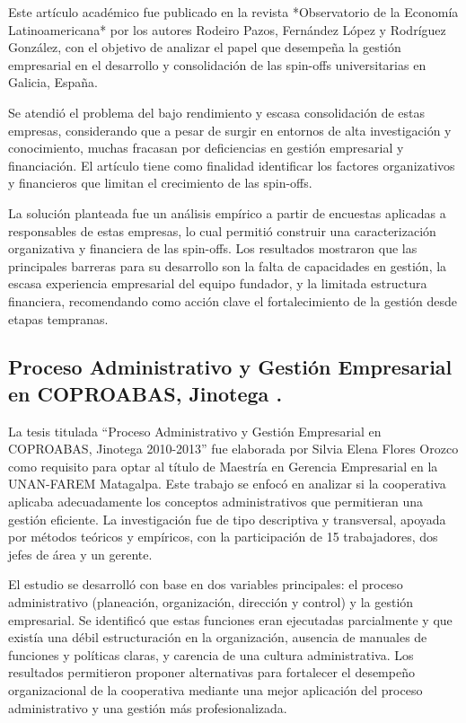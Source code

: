 Este artículo académico fue publicado en la revista *Observatorio de la Economía Latinoamericana* por los autores Rodeiro Pazos, Fernández López y Rodríguez González, con el objetivo de analizar el papel que desempeña la gestión empresarial en el desarrollo y consolidación de las spin-offs universitarias en Galicia, España. 

Se atendió el problema del bajo rendimiento y escasa consolidación de estas empresas, considerando que a pesar de surgir en entornos de alta investigación y conocimiento, muchas fracasan por deficiencias en gestión empresarial y financiación. El artículo tiene como finalidad identificar los factores organizativos y financieros que limitan el crecimiento de las spin-offs.

La solución planteada fue un análisis empírico a partir de encuestas aplicadas a responsables de estas empresas, lo cual permitió construir una caracterización organizativa y financiera de las spin-offs. Los resultados mostraron que las principales barreras para su desarrollo son la falta de capacidades en gestión, la escasa experiencia empresarial del equipo fundador, y la limitada estructura financiera, recomendando como acción clave el fortalecimiento de la gestión desde etapas tempranas.


\subsection{Proceso Administrativo y Gestión Empresarial en COPROABAS, Jinotega \cite{Flores15}.}
La tesis titulada “Proceso Administrativo y Gestión Empresarial en COPROABAS, Jinotega 2010-2013” fue elaborada por Silvia Elena Flores Orozco como requisito para optar al título de Maestría en Gerencia Empresarial en la UNAN-FAREM Matagalpa. Este trabajo se enfocó en analizar si la cooperativa aplicaba adecuadamente los conceptos administrativos que permitieran una gestión eficiente. La investigación fue de tipo descriptiva y transversal, apoyada por métodos teóricos y empíricos, con la participación de 15 trabajadores, dos jefes de área y un gerente.

El estudio se desarrolló con base en dos variables principales: el proceso administrativo (planeación, organización, dirección y control) y la gestión empresarial. Se identificó que estas funciones eran ejecutadas parcialmente y que existía una débil estructuración en la organización, ausencia de manuales de funciones y políticas claras, y carencia de una cultura administrativa. Los resultados permitieron proponer alternativas para fortalecer el desempeño organizacional de la cooperativa mediante una mejor aplicación del proceso administrativo y una gestión más profesionalizada.
